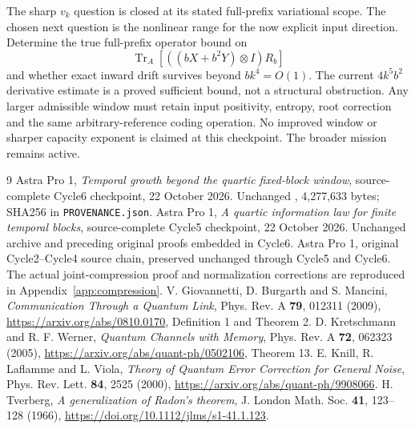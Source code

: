 \documentclass[11pt]{article}
\newcommand{\Tr}{\operatorname{Tr}}
\begin{document}
The sharp $v_k$ question is closed at its stated full-prefix variational
scope. The chosen next question is the nonlinear range for the now
explicit input direction. Determine the true full-prefix operator bound
on
\[
 \Tr_A[((bX+b^2Y)\otimes I)R_b]
\]
and whether exact inward drift survives beyond $bk^4=O(1)$. The current
$4k^5b^2$ derivative estimate is a proved sufficient bound, not a
structural obstruction. Any larger admissible window must retain input
positivity, entropy, root correction and the same arbitrary-reference
coding operation. No improved window or sharper capacity exponent is
claimed at this checkpoint. The broader mission remains active.



\appendix


\begingroup\small
\begin{thebibliography}{9}
\setlength{\itemsep}{2pt}\setlength{\parskip}{0pt}
 Astra Pro 1, \emph{Temporal growth beyond the quartic
fixed-block window}, source-complete Cycle6 checkpoint, 22 October 2026.
Unchanged ,
4,277,633 bytes; SHA256 in \texttt{PROVENANCE.json}.
 Astra Pro 1, \emph{A quartic information law for finite
temporal blocks}, source-complete Cycle5 checkpoint, 22 October 2026.
Unchanged archive and preceding original proofs embedded in Cycle6.
 Astra Pro 1, original Cycle2--Cycle4 source chain,
preserved unchanged through Cycle5 and Cycle6. The actual joint-compression
proof and normalization corrections are reproduced in
Appendix~\ref{app:compression}.
 V. Giovannetti, D. Burgarth and S. Mancini,
\emph{Communication Through a Quantum Link}, Phys. Rev. A \textbf{79},
012311 (2009), \url{https://arxiv.org/abs/0810.0170},
Definition 1 and Theorem 2.
 D. Kretschmann and R. F. Werner,
\emph{Quantum Channels with Memory}, Phys. Rev. A \textbf{72},
062323 (2005), \url{https://arxiv.org/abs/quant-ph/0502106}, Theorem 13.
 E. Knill, R. Laflamme and L. Viola,
\emph{Theory of Quantum Error Correction for General Noise},
Phys. Rev. Lett. \textbf{84}, 2525 (2000),
\url{https://arxiv.org/abs/quant-ph/9908066}.
 H. Tverberg, \emph{A generalization of Radon's theorem},
J. London Math. Soc. \textbf{41}, 123--128 (1966),
\url{https://doi.org/10.1112/jlms/s1-41.1.123}.
\end{thebibliography}
\endgroup
\end{document}
